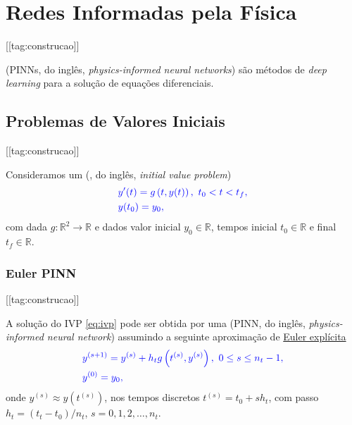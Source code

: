 
\chapter{Redes Informadas pela Física}\label{cap_pinns}
\thispagestyle{fancy}
[[tag:construcao]]

 (PINNs, do inglês, \textit{physics-informed neural networks}) são métodos de \textit{deep learning} para a solução de equações diferenciais.

\section{Problemas de Valores Iniciais}
[[tag:construcao]]

Consideramos um  (, do inglês, \textit{initial value problem})
\begin{subequations}\label{eq:ivp}\hleq
  \begin{align}
    &y'(t) = g\left(t, y(t)\right), ~t_0 < t < t_f,\\
    &y(t_0) = y_0,
  \end{align}
\end{subequations}
com dada $g:\mathbb{R}^2\to\mathbb{R}$ e dados valor inicial $y_0\in\mathbb{R}$, tempos inicial $t_0\in\mathbb{R}$ e final $t_f\in\mathbb{R}$.

\subsection{Euler PINN}
[[tag:construcao]]

A solução do IVP \eqref{eq:ivp} pode ser obtida por uma  (PINN, do inglês, \textit{physics-informed neural network}) assumindo a seguinte aproximação de \href{https://notaspedrok.com.br/notas/MatematicaNumericaII/cap_pvi_sec_euler.html}{Euler explícita}
\begin{subequations}\label{eq:ivp}\hleq
  \begin{align}
    &y^{(s+1)} = y^{(s)} + h_tg\left(t^{(s)}, y^{(s)}\right), ~0\leq s\leq n_t-1,\\
    &y^{(0)} = y_0,
  \end{align}
\end{subequations}
onde $y^{(s)} \approx y\left(t^{(s)}\right)$, nos tempos discretos $t^{(s)} = t_0 + sh_t$, com passo $h_t=(t_t-t_0)/n_t$, $s = 0, 1, 2, \dotsc, n_t$.

